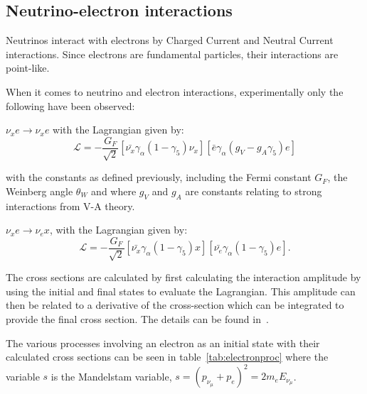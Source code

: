 \subsection{Neutrino-electron interactions}



Neutrinos interact with electrons by Charged Current and Neutral Current interactions. Since electrons are fundamental particles, their interactions are point-like.

When it comes to neutrino and electron interactions, experimentally only the following have been observed:

$\nu_x e \rightarrow \nu_x e$ with the Lagrangian given by:
\begin{equation}
\mathcal{L}=-\frac{G_F}{\sqrt{2}} \left[ \bar{\nu_x}\gamma_\alpha (1-\gamma_5)\nu_x \right] \left[ \bar{e} \gamma_\alpha (g_V-g_A \gamma_5)e \right]
\end{equation}

with the constants as defined previously, including the Fermi constant $G_F$, the Weinberg angle $\theta_W$ and where $g_V$ and $g_A$ are constants relating to strong interactions from V-A theory.

$\nu_x e \rightarrow \nu_e x$, with the Lagrangian given by:
\begin{equation}
\mathcal{L}=-\frac{G_F}{\sqrt{2}} \left[ \bar{\nu_x}\gamma_\alpha (1-\gamma_5)x\right] \left[ \bar{\nu_e}\gamma_\alpha (1-\gamma_5)e \right].
\end{equation}

The cross sections are calculated by first calculating the  interaction amplitude by using the initial and final states to evaluate the Lagrangian. This amplitude can then be related to a derivative of the cross-section which can be integrated to provide the final cross section. The details can be found in~\cite{3Peskin}.

The various processes involving an electron as an initial state with their calculated cross sections can be seen in table~\ref{tab:electronproc} where the variable $s$ is the Mandelstam variable, $s=(p_{\nu_\mu} + p_e)^2 = 2m_e E_{\nu_\mu}$.

